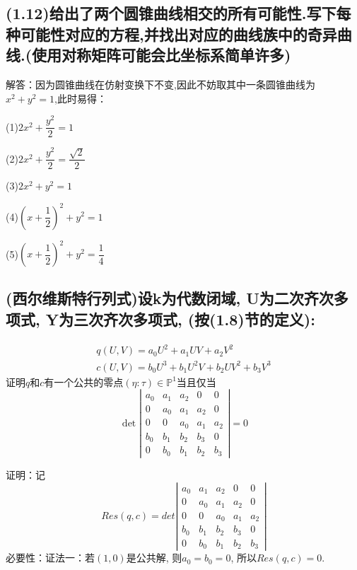 \documentclass[UTF8]{book}
\begin{document}
		\subsection{(1.12)给出了两个圆锥曲线相交的所有可能性.写下每种可能性对应的方程,并找出对应的曲线族中的奇异曲线.(使用对称矩阵可能会比坐标系简单许多)}
		
			解答：因为圆锥曲线在仿射变换下不变,因此不妨取其中一条圆锥曲线为$ x^{2}+y^{2} = 1 $,此时易得：
			
			
			(1)$ 2x^{2}+\dfrac{y^{2}}{2} = 1 $
			
			
			(2)$ 2x^{2}+\dfrac{y^{2}}{2} = \dfrac{\sqrt{2}}{2} $
			
			
			(3)$ 2x^{2}+y^{2} = 1 $
			
			
			(4)$ (x+\dfrac{1}{2})^{2}+y^{2} = 1 $
			
			
			(5)$ (x+\dfrac{1}{2})^{2}+y^{2} = \dfrac{1}{4} $
		
		
		
		
		
		\subsection{(西尔维斯特行列式)设k为代数闭域, U为二次齐次多项式, Y为三次齐次多项式, (按(1.8)节的定义):}
		\begin{equation*}
		\begin{array}{l}{q(U,V)=a_{0}U^{2}+a_{1}UV+a_{2}V^{2}} \\ {c(U,V)=b_{0}U^{3}+b_{1}U^{2}V+b_{2}UV^{2}+b_{3}V^{3}}\end{array}
		\end{equation*}
		证明$ q $和$ c $有一个公共的零点$(\eta:\tau)\in \mathbb{P}^{1}$当且仅当
		\begin{equation*}
		\operatorname{det}\left|\begin{array}{ccccc}{a_{0}} & {a_{1}} & {a_{2}} & {0} & {0} \\ {0} & {a_{0}} & {a_{1}} & {a_{2}} & {0} \\ {0} & {0} & {a_{0}} & {a_{1}} & {a_{2}} \\ {b_{0}} & {b_{1}} & {b_{2}} & {b_{3}} & {0} \\ {0} & {b_{0}} & {b_{1}} & {b_{2}} & {b_{3}}\end{array}\right|=0
		\end{equation*}
		
			证明：记\[Res(q,c)=
			det\left|\begin{array}{cccccc}
			  a_{0} &  a_{1} & a_{2}&0 &0\\
			    0 & a_{0} &  a_{1} & a_{2}&0 \\
			    0 & 0 &a_{0} &  a_{1} & a_{2}\\
			    b_{0} &  b_{1} & b_{2}& b_{3} &0\\
			    0 &  b_{0} &  b_{1} & b_{2}& b_{3}
			\end{array}\right|
			\]
			必要性：证法一：若$ (1,0) $是公共解, 则$a_{0}=b_{0}=0$, 所以$ Res(q,c)=0 $.
			
\end{document}

